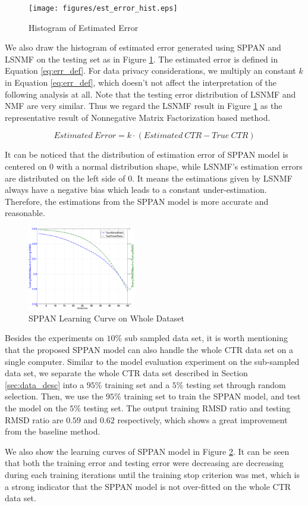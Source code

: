 \begin{figure}[!ht]
  \centering
  \texttt{[image: figures/est\_error\_hist.eps]}
  \caption{Histogram of Estimated Error}
  \label{fig:est_err}
\end{figure}

We also draw the histogram of estimated error generated using SPPAN
and LSNMF on the testing set as in Figure \ref{fig:est_err}. The
estimated error is defined in Equation \ref{eq:err_def}. For data
privacy considerations, we multiply an constant $k$ in Equation
\ref{eq:err_def}, which doesn't not affect the interpretation of the
following analysis at all. Note that the testing error distribution of
LSNMF and NMF are very similar. Thus we regard the LSNMF result in
Figure \ref{fig:est_err} as the representative result of Nonnegative
Matrix Factorization based method.

\begin{equation}
\label{eq:err_def}
Estimated~Error=k\cdot(Estimated~CTR - True~CTR)
\end{equation}

It can be noticed that the distribution of estimation error of SPPAN
model is centered on 0 with a normal distribution shape, while LSNMF's
estimation errors are distributed on the left side of 0. It means the
estimations given by LSNMF always have a negative bias which leads to
a constant under-estimation. Therefore, the estimations from the SPPAN
model is more accurate and reasonable.

\begin{figure}[!ht]
  \centering
  \includegraphics[width=0.42\textwidth]{figures/learning_curve_sppan_whole_relative.eps}
  \caption{SPPAN Learning Curve on Whole Dataset}
  \label{fig:sppan_curve_whole}
\end{figure}

Besides the experiments on $10\%$ sub sampled data set, it is worth
mentioning that the proposed SPPAN model can also handle the whole CTR
data set on a single computer. Similar to the model evaluation
experiment on the sub-sampled data set, we separate the whole CTR data
set described in Section \ref{sec:data_desc} into a $95\%$ training
set and a $5\%$ testing set through random selection. Then, we use the
$95\%$ training set to train the SPPAN model, and test the model on
the $5\%$ testing set. The output training RMSD ratio and testing RMSD
ratio are $0.59$ and $0.62$ respectively, which shows a great
improvement from the baseline method.

We also show the learning curves of SPPAN model in Figure
\ref{fig:sppan_curve_whole}. It can be seen that both the training
error and testing error were decreasing are decreasing during each
training iterations until the training stop criterion was met, which
is a strong indicator that the SPPAN model is not over-fitted on the
whole CTR data set.
